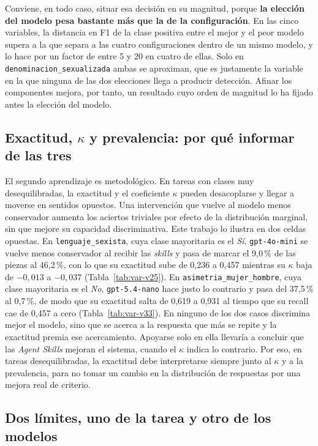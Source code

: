 Conviene, en todo caso, situar esa decisión en su magnitud, porque \textbf{la elección
del modelo pesa bastante más que la de la configuración}. En las cinco variables, la
distancia en F1 de la clase positiva entre el mejor y el peor modelo supera a la que
separa a las cuatro configuraciones dentro de un mismo modelo, y lo hace por un factor
de entre 5 y 20 en cuatro de ellas. Solo en \texttt{denominacion\_sexualizada} ambas se
aproximan, que es justamente la variable en la que ninguna de las dos elecciones llega
a producir detección. Afinar los componentes mejora, por tanto, un resultado cuyo orden
de magnitud lo ha fijado antes la elección del modelo.


\subsection{Exactitud, \texorpdfstring{$\kappa$}{kappa} y prevalencia: por qué informar de las tres}
\label{subsec:iris_tres_metricas}

El segundo aprendizaje es metodológico. En tareas con clases muy desequilibradas, la
exactitud y el coeficiente $\kappa$ pueden desacoplarse y llegar a moverse en
sentidos opuestos. Una intervención que vuelve al modelo menos conservador aumenta
los aciertos triviales por efecto de la distribución marginal, sin que mejore su capacidad
discriminativa. Este trabajo lo ilustra en dos celdas opuestas. En
\texttt{lenguaje\_sexista}, cuya clase mayoritaria es el \textit{Sí},
\texttt{gpt-4o-mini} se vuelve menos conservador al recibir las \textit{skills} y pasa
de marcar el 9,0\,\% de las piezas al 46,2\,\%, con lo que su exactitud sube de 0,236 a
0,457 mientras su $\kappa$ baja de $-0,013$ a $-0,037$ (Tabla~\ref{tab:var-v25}). En
\texttt{asimetria\_mujer\_hombre}, cuya clase mayoritaria es el \textit{No},
\texttt{gpt-5.4-nano} hace justo lo contrario y pasa del 37,5\,\% al 0,7\,\%, de modo
que su exactitud salta de 0,619 a 0,931 al tiempo que su recall cae de 0,457 a cero
(Tabla~\ref{tab:var-v33}). En ninguno de los dos casos discrimina mejor el modelo, sino
que se acerca a la respuesta que más se repite y la exactitud premia ese acercamiento.
Apoyarse solo en ella llevaría a concluir que las \textit{Agent Skills} mejoran el
sistema, cuando el $\kappa$ indica lo contrario. Por eso, en tareas
desequilibradas, la exactitud debe interpretarse siempre junto al $\kappa$ y a la
prevalencia, para no tomar un cambio en la distribución de respuestas por una mejora
real de criterio.


\subsection{Dos límites, uno de la tarea y otro de los modelos}
\label{subsec:iris_dos_limites}

